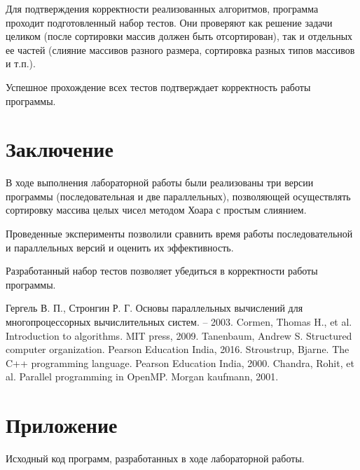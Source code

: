 \documentclass{report}
\begin{document}
Для подтверждения корректности реализованных алгоритмов, программа проходит подготовленный набор тестов. Они проверяют как решение задачи целиком (после сортировки массив должен быть отсортирован), так и отдельных ее частей (слияние массивов разного размера, сортировка разных типов массивов и т.п.).
\par Успешное прохождение всех тестов подтверждает корректность работы программы.
\newpage

\section*{Заключение}
В ходе выполнения лабораторной работы были реализованы три версии программы (последовательная и две параллельных), позволяющей осуществлять сортировку массива целых чисел методом Хоара с простым слиянием.
\par Проведенные эксперименты позволили сравнить время работы последовательной и параллельных версий и оценить их эффективность.
\par Разработанный набор тестов позволяет убедиться в корректности работы программы.
\newpage

\begin{thebibliography}{1}
 Гергель В. П., Стронгин Р. Г. Основы параллельных вычислений для многопроцессорных вычислительных систем. – 2003.
 Cormen, Thomas H., et al. Introduction to algorithms. MIT press, 2009.
 Tanenbaum, Andrew S. Structured computer organization. Pearson Education India, 2016.
 Stroustrup, Bjarne. The C++ programming language. Pearson Education India, 2000.
 Chandra, Rohit, et al. Parallel programming in OpenMP. Morgan kaufmann, 2001.
\end{thebibliography}
\newpage

\section*{Приложение}
Исходный код программ, разработанных в ходе лабораторной работы.
\end{document}
